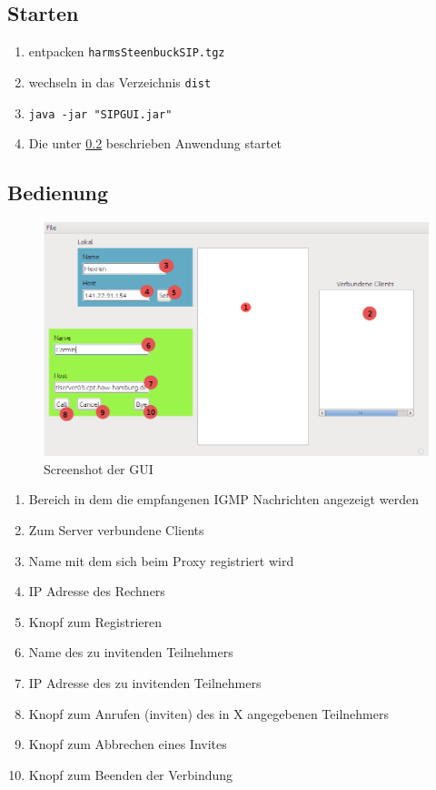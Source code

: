 \documentclass[10pt]{scrartcl}
\begin{document}
\subsection{Starten}
\begin{enumerate}
	\item entpacken \verb!harmsSteenbuckSIP.tgz!
	\item wechseln in das Verzeichnis \verb!dist!
	\item \verb!java -jar "SIPGUI.jar"!
	\item Die unter \ref{sec:bedienung:anwendung} beschrieben Anwendung startet
\end{enumerate}


\subsection{Bedienung}
\label{sec:bedienung:anwendung}		
	\begin{figure}[H]
        \centering
                \includegraphics[width=\textwidth]{img/screenshotApplication}
        \caption{Screenshot der GUI}
        \label{img:gui}
	\end{figure}

\begin{enumerate}
	\item Bereich in dem die empfangenen IGMP Nachrichten angezeigt werden
	\item Zum Server verbundene Clients
	\item Name mit dem sich beim Proxy registriert wird
	\item IP Adresse des Rechners
	\item Knopf zum Registrieren
	\item Name des zu invitenden Teilnehmers
	\item IP Adresse des zu invitenden Teilnehmers
	\item Knopf zum Anrufen (inviten) des in X angegebenen Teilnehmers
	\item Knopf zum Abbrechen eines Invites
	\item Knopf zum Beenden der Verbindung
\end{enumerate}
\end{document}
